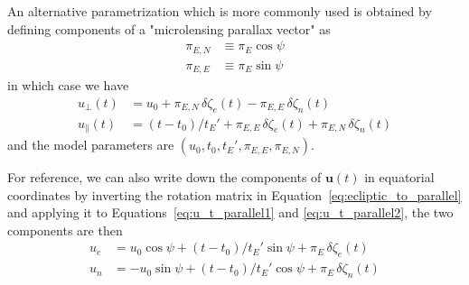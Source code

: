 \documentclass[12pt,dvipsnames]{report}
\begin{document}
An alternative parametrization which is more commonly used is obtained by
defining components of a "microlensing parallax vector" as
\begin{align}
    \pi_{E,N} & \equiv \pi_E\cos\psi \\
    \pi_{E,E} & \equiv \pi_E\sin\psi
\end{align}
in which case we have
\begin{align}
    u_\bot(t)      & = u_0 + \pi_{E,N}\,\delta \zeta_e(t) - \pi_{E,E}\,\delta \zeta_n(t) \\
    u_\parallel(t) & =(t-t_0)/t_E' + \pi_{E,E}\,\delta\zeta_e(t) +
    \pi_{E,N}\,\delta\zeta_n(t)
\end{align}
and the model parameters are $\left(u_0,t_0,t_E',\pi_{E,E},\pi_{E,N}\right)$.

For reference, we can also write down the components of $\mathbf{u}(t)$ in
equatorial coordinates by inverting the rotation matrix in
Equation~\ref{eq:ecliptic_to_parallel} and applying it to
Equations~\ref{eq:u_t_parallel1} and \ref{eq:u_t_parallel2}, the two components
are then
\begin{align}
    u_e & =u_0\cos\psi + (t-t_0)/t_E'\sin\psi + \pi_E\,\delta\zeta_e(t)  \\
    u_n & =-u_0\sin\psi + (t-t_0)/t_E'\cos\psi + \pi_E\,\delta\zeta_n(t)
\end{align}
\end{document}
